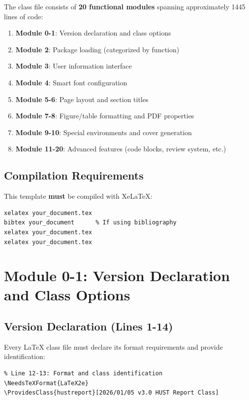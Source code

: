 \documentclass[linux]{hustreport}
\begin{document}
The class file consists of \textbf{20 functional modules} spanning approximately 1445 lines of code:

\begin{enumerate}
    \item \textbf{Module 0-1}: Version declaration and class options
    \item \textbf{Module 2}: Package loading (categorized by function)
    \item \textbf{Module 3}: User information interface
    \item \textbf{Module 4}: Smart font configuration
    \item \textbf{Module 5-6}: Page layout and section titles
    \item \textbf{Module 7-8}: Figure/table formatting and PDF properties
    \item \textbf{Module 9-10}: Special environments and cover generation
    \item \textbf{Module 11-20}: Advanced features (code blocks, review system, etc.)
\end{enumerate}

\subsection{Compilation Requirements}

This template \textbf{must} be compiled with XeLaTeX:

\begin{verbatim}
xelatex your_document.tex
bibtex your_document      % If using bibliography
xelatex your_document.tex
xelatex your_document.tex
\end{verbatim}

\newpage
\section{Module 0-1: Version Declaration and Class Options}

\subsection{Version Declaration (Lines 1-14)}

Every \LaTeX{} class file must declare its format requirements and provide identification:

\begin{verbatim}
% Line 12-13: Format and class identification
\NeedsTeXFormat{LaTeX2e}
\ProvidesClass{hustreport}[2026/01/05 v3.0 HUST Report Class]
\end{verbatim}
\end{document}
